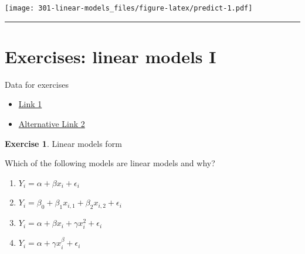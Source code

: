\documentclass[
]{book}
\newenvironment{Shaded}{\begin{snugshade}}{\end{snugshade}}
\newcommand{\CommentTok}[1]{\textcolor[rgb]{0.56,0.35,0.01}{\textit{#1}}}
\newcommand{\DataTypeTok}[1]{\textcolor[rgb]{0.13,0.29,0.53}{#1}}
\newcommand{\DecValTok}[1]{\textcolor[rgb]{0.00,0.00,0.81}{#1}}
\newcommand{\KeywordTok}[1]{\textcolor[rgb]{0.13,0.29,0.53}{\textbf{#1}}}
\newcommand{\NormalTok}[1]{#1}
\newcommand{\OperatorTok}[1]{\textcolor[rgb]{0.81,0.36,0.00}{\textbf{#1}}}
\newcommand{\StringTok}[1]{\textcolor[rgb]{0.31,0.60,0.02}{#1}}
\providecommand{\tightlist}{%
  \setlength{\itemsep}{0pt}\setlength{\parskip}{0pt}}
\theoremstyle{definition}
\theoremstyle{definition}
\theoremstyle{definition}
\newtheorem{exercise}{Exercise}[chapter]
\theoremstyle{remark}
\begin{document}
\begin{Shaded}
\end{Shaded}

\texttt{[image: 301-linear-models\_files/figure-latex/predict-1.pdf]}

\begin{center}\rule{0.5\linewidth}{0.5pt}\end{center}

\hypertarget{exercises-linear-models-i}{%
\section{Exercises: linear models I}\label{exercises-linear-models-i}}

Data for exercises

\begin{itemize}
\tightlist
\item
  \href{https://github.com/olgadet/bookdown-mlbiostatistics/tree/master/data/lm/data.zip}{Link 1}
\item
  \href{https://stockholmuniversity.box.com/s/z5kwg0nlwe5la4h5t8bshpj57pylif14}{Alternative Link 2}
\end{itemize}

\begin{exercise}
\protect\hypertarget{exr:lm-recognize}{}{\label{exr:lm-recognize} }Linear models form

Which of the following models are linear models and why?

\begin{enumerate}
\def\labelenumi{\alph{enumi})}
\tightlist
\item
  \(Y_i=\alpha + \beta x_i + \epsilon_i\)
\item
  \(Y_i=\beta_0 + \beta_1 x_{i,1} + \beta_2 x_{i,2} + \epsilon_i\)
\item
  \(Y_i=\alpha + \beta x_i + \gamma x_i^2 + \epsilon_i\)
\item
  \(Y_i=\alpha + \gamma x_i^\beta + \epsilon_i\)
\end{enumerate}
\end{exercise}
\end{document}

